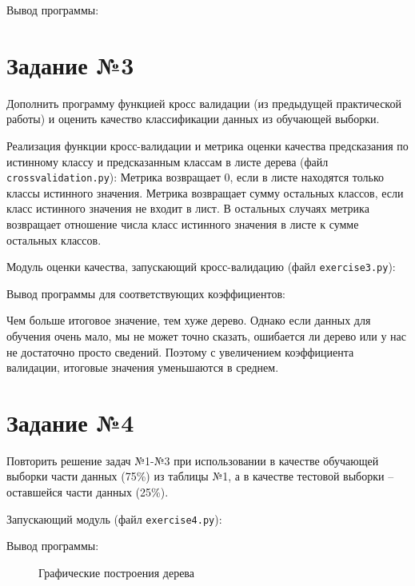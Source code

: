 \documentclass{article} %
\begin{document}
Вывод программы:


\clearpage
\section{Задание №3}
Дополнить программу функцией кросс валидации (из предыдущей практической
работы) и оценить качество классификации данных из обучающей выборки.
\bigskip

Реализация функции кросс-валидации
и метрика оценки качества предсказания
по истинному классу и предсказанным классам в листе дерева
(файл \verb$crossvalidation.py$):
Метрика возвращает 0,
если в листе находятся только классы истинного значения.
Метрика возвращает сумму остальных классов, если класс истинного значения
не входит в лист.
В остальных случаях метрика возвращает отношение числа класс истинного значения
в листе к сумме остальных классов.
\bigskip

Модуль оценки качества, запускающий кросс-валидацию (файл \verb$exercise3.py$):
\bigskip

Вывод программы для соответствующих коэффициентов:


Чем больше итоговое значение, тем хуже дерево.
Однако если данных для обучения очень мало,
мы не может точно сказать,
ошибается ли дерево или у нас не достаточно просто сведений.
Поэтому с увеличением коэффициента валидации,
итоговые значения уменьшаются в среднем.

\clearpage
\section{Задание №4}
Повторить решение задач №1-№3 при использовании в качестве обучающей
выборки части данных (75\%) из таблицы №1, а в качестве тестовой выборки –
оставшейся части данных (25\%).
\bigskip

Запускающий модуль (файл \verb$exercise4.py$):
\bigskip

Вывод программы:


\begin{figure}[H]
	\centering
	\hfill
    \caption{Графические построения дерева}
\end{figure}
\end{document}
